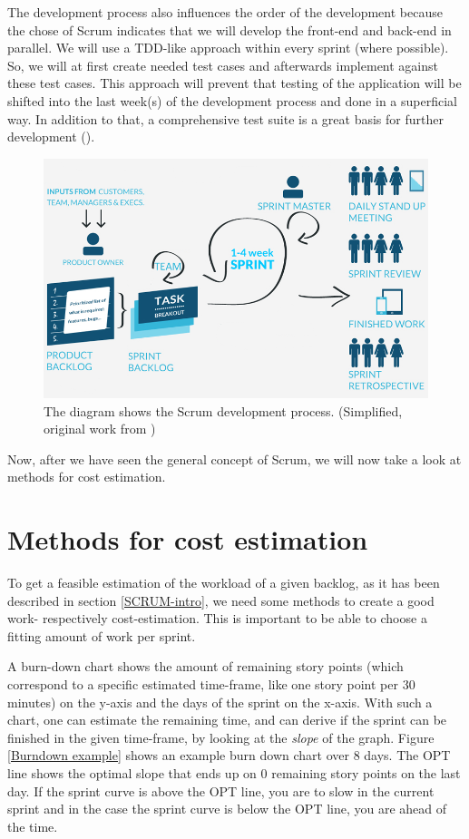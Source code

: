 The development process also influences the order of the development because the chose of Scrum indicates that we will develop the front-end and back-end in parallel. We will use a \ac{TDD}-like approach within every sprint (where possible). So, we will at first create needed test cases and afterwards implement against these test cases. This approach will prevent that testing of the application will be shifted into the last week(s) of the development process and done in a superficial way. In addition to that, a comprehensive test suite is a great basis for further development (\cite{max03}).

\begin{figure}[th]
\centerline{\includegraphics[width=1\textwidth]{gfx/scrum}}
\caption{The diagram shows the Scrum development process. (Simplified, original work from \cite{SCRUMPic})}
\label{ScrumDia}
\end{figure}

Now, after we have seen the general concept of Scrum, we will now take a look at methods for cost estimation. 

\section{Methods for cost estimation}
\label{cost}
To get a feasible estimation of the workload of a given backlog, as it has been described in section \ref{SCRUM-intro}, we need some methods to create a good work- respectively cost-estimation. This is important to be able to choose a fitting amount of work per sprint.


A burn-down chart shows the amount of remaining story points (which correspond to a specific estimated time-frame, like one story point per 30 minutes) on the y-axis and the days of the sprint on the x-axis. With such a chart, one can estimate the remaining time, and can derive if the sprint can be finished in the given time-frame, by looking at the \textit{slope} of the graph. Figure \ref{Burndown example} shows an example burn down chart over 8 days. The OPT line shows the optimal slope that ends up on 0 remaining story points on the last day. If the sprint curve is above the OPT line, you are to slow in the current sprint and in the case the sprint curve is below the OPT line, you are ahead of the time.

